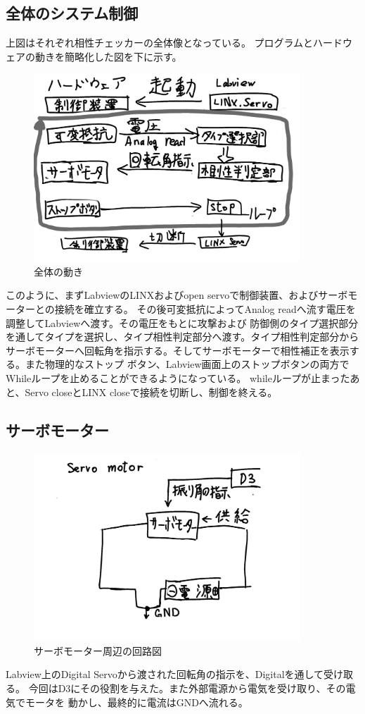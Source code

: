 \documentclass[a4paper,titlepage,11pt]{ltjsarticle}
\begin{document}
\subsection{全体のシステム制御}
上図はそれぞれ相性チェッカーの全体像となっている。
プログラムとハードウェアの動きを簡略化した図を下に示す。
\begin{figure}[H]
  \begin{center}
    \includegraphics[width=100mm]{hardtosoft.pdf}
    \caption{全体の動き}
  \end{center}
\end{figure}
このように、まずLabviewのLINXおよびopen servoで制御装置、およびサーボモーターとの接続を確立する。
その後可変抵抗によってAnalog readへ流す電圧を調整してLabviewへ渡す。その電圧をもとに攻撃および
防御側のタイプ選択部分を通してタイプを選択し、タイプ相性判定部分へ渡す。タイプ相性判定部分から
サーボモーターへ回転角を指示する。そしてサーボモーターで相性補正を表示する。また物理的なストップ
ボタン、Labview画面上のストップボタンの両方でWhileループを止めることができるようになっている。
whileループが止まったあと、Servo closeとLINX closeで接続を切断し、制御を終える。
\subsection{サーボモーター}
\begin{figure}[H]
  \begin{center}
    \includegraphics[width=100mm]{servo_h.pdf}
    \caption{サーボモーター周辺の回路図}
  \end{center}
\end{figure}
  Labview上のDigital Servoから渡された回転角の指示を、Digitalを通して受け取る。
  今回はD3にその役割を与えた。また外部電源から電気を受け取り、その電気でモータを
  動かし、最終的に電流はGNDへ流れる。
\end{document}
